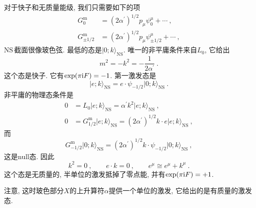 对于快子和无质量能级, 我们只需要如下的项
\begin{subequations}
    \begin{align}
        G_{0}^{\text{m}} &= (2\alpha^{\prime})^{1/2} p_{\mu}\psi_{0}^{\mu} +\cdots \:, \label{10.5.6a} \\
        G_{\pm 1/2}^{\text{m}} &= (2\alpha^{\prime})^{1/2} p_{\mu}\psi_{\pm 1/2}^{\mu} +\cdots \:, \label{10.5.6b}
    \end{align} \label{10.5.6}
\end{subequations}
NS\,截面很像玻色弦. 最低的态是$ \lvert 0;k\rangle_{\text{NS}}$. 唯一的非平庸条件来自$ L_{0}$, 它给出
\begin{equation}
    m^{2}=-k^{2} = -\frac{1}{2\alpha^{\prime}} \:. \label{10.5.7}
\end{equation}
这个态是快子. 它有$\exp(\pi\mathrm{i} F)=-1$. 第一激发态是
\begin{equation}
    \lvert e;k \rangle_{\text{NS}} = e\cdot \psi_{-1/2} \lvert 0;k\rangle _{\text{NS}} \:. \label{10.5.8}
\end{equation}
非平庸的物理态条件是 
\begin{subequations}
    \begin{align} 
        0 &= L_{0} \lvert e;k\rangle_{\text{NS}}=\alpha^{\prime} k^{2} \lvert e;k\rangle_{\text{NS}} \:, \label{10.5.9a} \\
        0 &= G_{1/2}^{\text{m}}\lvert e;k\rangle_{\text{NS}}=(2\alpha^{\prime})^{1/2}k\cdot e\lvert e;k\rangle_{\text{NS}}\:, \label{10.5.9b}
    \end{align}  \label{10.5.9} %
\end{subequations}
而
\begin{equation}
    G_{-1/2}^{\text{m}}\lvert 0;k\rangle_{\text{NS}}=(2\alpha^{\prime})^{1/2}k\cdot \psi_{-1/2}
    \lvert 0;k\rangle_{\text{NS}}\:, \label{10.5.10}
\end{equation}
这是null态. 因此
\begin{equation}
    k^{2}=0 \:,\qquad e\cdot k=0\:, \qquad e^{\mu}\cong e^{\mu} + k^{\mu} \:. \label{10.5.11}
\end{equation}
这个态是无质量的, 半单位的激发抵掉了零点能, 并有$ \exp(\pi\mathrm{i} F)=+1$. 
\begin{tcolorbox}
注意, 这时玻色部分$ X $的上升算符$ \alpha $提供一个单位的激发, 它给出的是有质量的激发态.
\end{tcolorbox}

